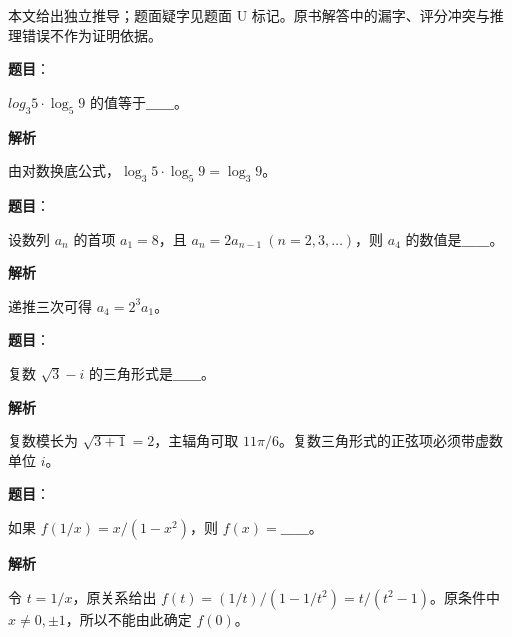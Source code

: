 

\begin{gktip}
本文给出独立推导；题面疑字见题面 U 标记。原书解答中的漏字、评分冲突与推理错误不作为证明依据。
\end{gktip}

\begin{answer}

\textbf{题目}：

$log_3 5\cdot\log_5 9$ 的值等于＿＿。

\textbf{解析}

由对数换底公式，$\log_3 5\cdot\log_5 9=\log_3 9$。


\end{answer}
\begin{answer}

\textbf{题目}：

设数列 ${a_n}$ 的首项 $a_1=8$，且 $a_n=2a_{n-1}\ (n=2,3,\ldots)$，则 $a_4$ 的数值是＿＿。

\textbf{解析}

递推三次可得 $a_4=2^3a_1$。


\end{answer}
\begin{answer}

\textbf{题目}：

复数 $\sqrt3-i$ 的三角形式是＿＿。

\textbf{解析}

复数模长为 $\sqrt{3+1}=2$，主辐角可取 $11\pi/6$。复数三角形式的正弦项必须带虚数单位 $i$。


\end{answer}
\begin{answer}

\textbf{题目}：

如果 $f(1/x)=x/(1-x^2)$，则 $f(x)=$＿＿。

\textbf{解析}

令 $t=1/x$，原关系给出 $f(t)=(1/t)/(1-1/t^2)=t/(t^2-1)$。原条件中 $x\ne0,\pm1$，所以不能由此确定 $f(0)$。


\end{answer}
